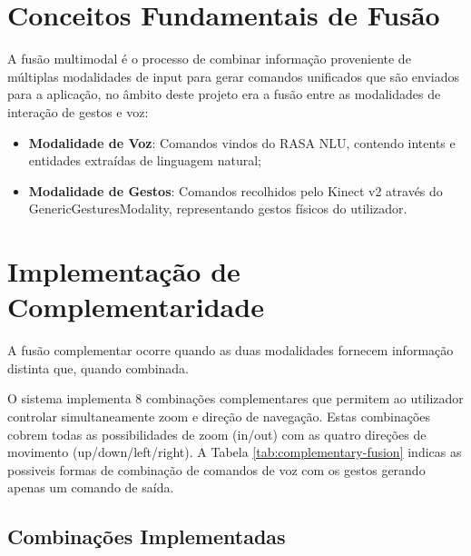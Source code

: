 \documentclass{report}
\begin{document}
\section{Conceitos Fundamentais de Fusão}

A fusão multimodal é o processo de combinar informação proveniente de múltiplas modalidades de input para gerar comandos unificados que são enviados para a aplicação, no âmbito deste projeto era a fusão entre as modalidades de interação de gestos e voz:

\begin{itemize}
    \item \textbf{Modalidade de Voz}: Comandos vindos do RASA NLU, contendo intents e entidades extraídas de linguagem natural;
    \item \textbf{Modalidade de Gestos}: Comandos recolhidos pelo Kinect v2 através do GenericGesturesModality, representando gestos físicos do utilizador.
\end{itemize}


\section{Implementação de Complementaridade}

A fusão complementar ocorre quando as duas modalidades fornecem informação distinta que, quando combinada. 

O sistema implementa 8 combinações complementares que permitem ao utilizador controlar simultaneamente zoom e direção de navegação. Estas combinações cobrem todas as possibilidades de zoom (in/out) com as quatro direções de movimento (up/down/left/right). A Tabela \ref{tab:complementary-fusion} indicas as possiveis formas de combinação de comandos de voz com os gestos gerando apenas um comando de saída. 

\subsection{Combinações Implementadas}
\end{document}
